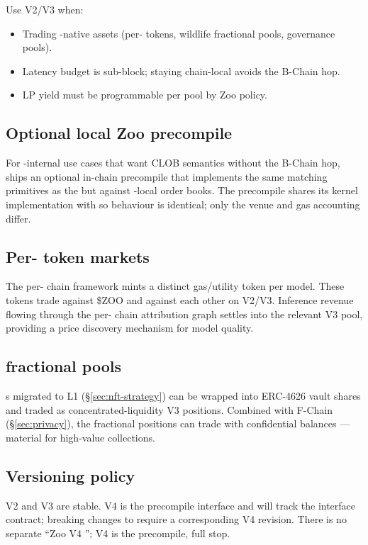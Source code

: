 Use V2/V3 when:

\begin{itemize}[leftmargin=1.2em]
  \item Trading \Zoo{}-native assets (per-\LLM{} tokens, wildlife \NFT{}
        fractional pools, \DAO{} governance pools).
  \item Latency budget is sub-block; staying chain-local avoids the
        B-Chain hop.
  \item LP yield must be programmable per pool by Zoo \DAO{} policy.
\end{itemize}

\subsection{Optional local Zoo \DEX{} precompile}

For \Zoo{}-internal use cases that want CLOB semantics without the
B-Chain hop, \Zoo{} ships an optional in-chain \DEX{} precompile that
implements the same matching primitives as the \Lux{} \DEX{} but
against \Zoo{}-local order books. The precompile shares its kernel
implementation with \Lux{} \DEX{} so behaviour is identical; only
the venue and gas accounting differ.

\subsection{Per-\LLM{} token markets}

The per-\LLM{} chain framework \cite{zoo-per-llm-chains} mints a
distinct gas/utility token per \Zen{} model. These tokens trade against
\$ZOO and against each other on \Zoo{} \DEX{} V2/V3. Inference revenue
flowing through the per-\LLM{} chain attribution graph settles into
the relevant V3 pool, providing a price discovery mechanism for model
quality.

\subsection{\NFT{} fractional pools}

\NFT{}s migrated to \Zoo{} L1 (\S\ref{sec:nft-strategy}) can be wrapped
into ERC-4626 vault shares and traded as concentrated-liquidity V3
positions. Combined with F-Chain \FHE{} (\S\ref{sec:privacy}), the
fractional positions can trade with confidential balances --- material
for high-value collections.

\subsection{Versioning policy}

\Zoo{} \DEX{} V2 and V3 are stable. V4 is the precompile interface and
will track the \Lux{} \DEX{} interface contract; breaking changes to
\Lux{} \DEX{} require a corresponding \Zoo{} \DEX{} V4 revision. There
is no separate ``Zoo V4 \AMM{}''; V4 is the precompile, full stop.
